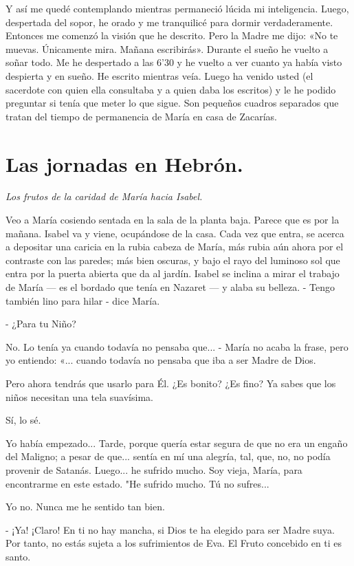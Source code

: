 \documentclass[12pt]{book} %
\begin{document}
Y así me quedé contemplando mientras permaneció lúcida mi inteligencia. Luego, despertada del sopor, he orado y me tranquilicé para dormir verdaderamente. Entonces me comenzó la visión que he descrito. Pero la Madre me dijo: «No te muevas. Únicamente mira. Mañana escribirás». Durante el sueño he vuelto a soñar todo. Me he despertado a las 6'30 y he vuelto a ver cuanto ya había visto despierta y en sueño. He escrito mientras veía. Luego ha venido usted (el sacerdote con quien ella consultaba y a quien daba los escritos) y le he podido preguntar si tenía que meter lo que sigue. Son pequeños cuadros separados que tratan del tiempo de permanencia de María en casa de Zacarías. 

\chapter{Las jornadas en Hebrón.}
\emph{Los frutos de la caridad de María hacia Isabel.}
 
Veo a María cosiendo sentada en la sala de la planta baja. Parece que es por la mañana. Isabel va y viene, ocupándose de la casa. Cada vez que entra, se acerca a depositar una caricia en la rubia cabeza de María, más rubia aún ahora por el contraste con las paredes; más bien oscuras, y bajo el rayo del luminoso sol que entra por la puerta abierta que da al jardín. Isabel se inclina a mirar el trabajo de María — es el bordado que tenía en Nazaret — y alaba su belleza. - Tengo también lino para hilar - dice María. 

- ¿Para tu Niño? 

No. Lo tenía ya cuando todavía no pensaba que... - María no acaba la frase, pero yo entiendo: «... cuando todavía no pensaba que iba a ser Madre de Dios. 

Pero ahora tendrás que usarlo para Él. ¿Es bonito? ¿Es fino? Ya sabes que los niños necesitan una tela suavísima. 

Sí, lo sé. 

Yo había empezado... Tarde, porque quería estar segura de que no era un engaño del Maligno; a pesar de que... sentía en mí una alegría, tal, que, no, no podía provenir de Satanás. Luego... he sufrido mucho. Soy vieja, María, para encontrarme en este estado. "He sufrido mucho. Tú no sufres... 

Yo no. Nunca me he sentido tan bien. 

- ¡Ya! ¡Claro! En ti no hay mancha, si Dios te ha elegido para ser Madre suya. Por tanto, no estás sujeta a los sufrimientos de Eva. El Fruto concebido en ti es santo. 
\end{document}
